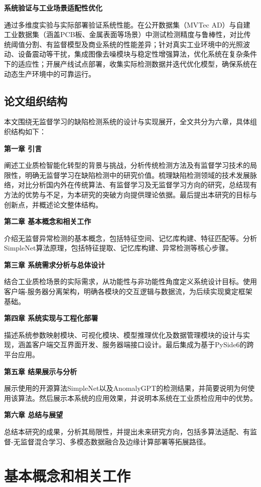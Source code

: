 \documentclass[
  ]{njuthesis}
\begin{document}
\textbf{系统验证与工业场景适配性优化}  

通过多维度实验与实际部署验证系统性能。在公开数据集（MVTec AD）与自建工业数据集（涵盖PCB板、金属表面等场景）中测试检测精度与鲁棒性，对比传统阈值分割、有监督模型及商业系统的性能差异；针对真实工业环境中的光照波动、设备震动等干扰，集成图像去噪模块与稳定性增强算法，优化系统在复杂条件下的适应性；开展产线试点部署，收集实际检测数据并迭代优化模型，确保系统在动态生产环境中的可靠运行。  

\section{论文组织结构}

本文围绕无监督学习的缺陷检测系统的设计与实现展开，全文共分为六章，具体组织结构如下：  

\textbf{第一章 引言}  

阐述工业质检智能化转型的背景与挑战，分析传统检测方法及有监督学习技术的局限性，明确无监督学习在缺陷检测中的研究价值。梳理缺陷检测领域的技术发展脉络，对比分析国内外在传统算法、有监督学习及无监督学习方向的研究，总结现有方法的优势与不足，为本研究的突破方向提供理论依据。最后提出本研究的目标与创新点，并概述论文整体结构。  

\textbf{第二章 基本概念和相关工作}  

介绍无监督异常检测的基本概念，包括特征空间、记忆库构建、特征匹配等。分析SimpleNet算法原理，包括特征提取、记忆库构建、异常检测等核心步骤。  

\textbf{第三章 系统需求分析与总体设计}  

结合工业质检场景的实际需求，从功能性与非功能性角度定义系统设计目标。使用客户端-服务器分离架构，明确各模块的交互逻辑与数据流，为后续实现奠定框架基础。   

\textbf{第四章 系统实现与工程化部署}  

描述系统参数映射模块、可视化模块、模型推理优化及数据管理模块的设计与实现，涵盖客户端交互界面开发、服务器端接口设计。最后集成为基于PySide6的跨平台应用。

\textbf{第五章 结果展示与分析}  

展示使用的开源算法SimpleNet以及AnomalyGPT的检测结果，并简要说明为何使用该算法。然后展示本系统的应用效果，并说明本系统在工业质检应用中的优势。  

\textbf{第六章 总结与展望}  

总结本研究的成果，分析其局限性，并提出未来研究方向，包括多算法适配、有监督-无监督混合学习、多模态数据融合及边缘计算部署等拓展路径。

\chapter{基本概念和相关工作}
\end{document}
